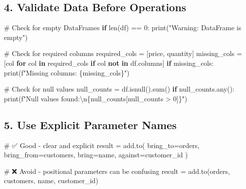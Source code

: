 \documentclass[
  letterpaper,
]{scrbook}
\newenvironment{Shaded}{\begin{snugshade}}{\end{snugshade}}
\newcommand{\BuiltInTok}[1]{\textcolor[rgb]{0.00,0.23,0.31}{#1}}
\newcommand{\CharTok}[1]{\textcolor[rgb]{0.13,0.47,0.30}{#1}}
\newcommand{\CommentTok}[1]{\textcolor[rgb]{0.37,0.37,0.37}{#1}}
\newcommand{\ControlFlowTok}[1]{\textcolor[rgb]{0.00,0.23,0.31}{\textbf{#1}}}
\newcommand{\DecValTok}[1]{\textcolor[rgb]{0.68,0.00,0.00}{#1}}
\newcommand{\KeywordTok}[1]{\textcolor[rgb]{0.00,0.23,0.31}{\textbf{#1}}}
\newcommand{\NormalTok}[1]{\textcolor[rgb]{0.00,0.23,0.31}{#1}}
\newcommand{\OperatorTok}[1]{\textcolor[rgb]{0.37,0.37,0.37}{#1}}
\newcommand{\SpecialCharTok}[1]{\textcolor[rgb]{0.37,0.37,0.37}{#1}}
\newcommand{\SpecialStringTok}[1]{\textcolor[rgb]{0.13,0.47,0.30}{#1}}
\newcommand{\StringTok}[1]{\textcolor[rgb]{0.13,0.47,0.30}{#1}}
\begin{document}
\subsection{4. Validate Data Before
Operations}\label{validate-data-before-operations}

\begin{Shaded}
\begin{Highlighting}[]
\CommentTok{\# Check for empty DataFrames}
\ControlFlowTok{if} \BuiltInTok{len}\NormalTok{(df) }\OperatorTok{==} \DecValTok{0}\NormalTok{:}
    \BuiltInTok{print}\NormalTok{(}\StringTok{"Warning: DataFrame is empty"}\NormalTok{)}

\CommentTok{\# Check for required columns}
\NormalTok{required\_cols }\OperatorTok{=}\NormalTok{ [}\StringTok{\textquotesingle{}price\textquotesingle{}}\NormalTok{, }\StringTok{\textquotesingle{}quantity\textquotesingle{}}\NormalTok{]}
\NormalTok{missing\_cols }\OperatorTok{=}\NormalTok{ [col }\ControlFlowTok{for}\NormalTok{ col }\KeywordTok{in}\NormalTok{ required\_cols }\ControlFlowTok{if}\NormalTok{ col }\KeywordTok{not} \KeywordTok{in}\NormalTok{ df.columns]}
\ControlFlowTok{if}\NormalTok{ missing\_cols:}
    \BuiltInTok{print}\NormalTok{(}\SpecialStringTok{f"Missing columns: }\SpecialCharTok{\{}\NormalTok{missing\_cols}\SpecialCharTok{\}}\SpecialStringTok{"}\NormalTok{)}

\CommentTok{\# Check for null values}
\NormalTok{null\_counts }\OperatorTok{=}\NormalTok{ df.isnull().}\BuiltInTok{sum}\NormalTok{()}
\ControlFlowTok{if}\NormalTok{ null\_counts.}\BuiltInTok{any}\NormalTok{():}
    \BuiltInTok{print}\NormalTok{(}\SpecialStringTok{f"Null values found:}\CharTok{\textbackslash{}n}\SpecialCharTok{\{}\NormalTok{null\_counts[null\_counts }\OperatorTok{\textgreater{}} \DecValTok{0}\NormalTok{]}\SpecialCharTok{\}}\SpecialStringTok{"}\NormalTok{)}
\end{Highlighting}
\end{Shaded}

\subsection{5. Use Explicit Parameter
Names}\label{use-explicit-parameter-names}

\begin{Shaded}
\begin{Highlighting}[]
\CommentTok{\# ✅ Good {-} clear and explicit}
\NormalTok{result }\OperatorTok{=}\NormalTok{ add.to(}
\NormalTok{    bring\_to}\OperatorTok{=}\NormalTok{orders,}
\NormalTok{    bring\_from}\OperatorTok{=}\NormalTok{customers,}
\NormalTok{    bring}\OperatorTok{=}\StringTok{\textquotesingle{}name\textquotesingle{}}\NormalTok{,}
\NormalTok{    against}\OperatorTok{=}\StringTok{\textquotesingle{}customer\_id\textquotesingle{}}
\NormalTok{)}

\CommentTok{\# ❌ Avoid {-} positional parameters can be confusing}
\NormalTok{result }\OperatorTok{=}\NormalTok{ add.to(orders, customers, }\StringTok{\textquotesingle{}name\textquotesingle{}}\NormalTok{, }\StringTok{\textquotesingle{}customer\_id\textquotesingle{}}\NormalTok{)}
\end{Highlighting}
\end{Shaded}
\end{document}
